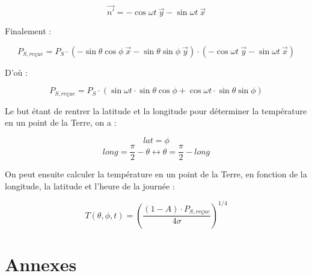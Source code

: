\documentclass[a4paper,11pt]{article}
\begin{document}
\[ \vec{n'} = - \cos \omega t ~ \vec{y} - \sin \omega t ~ \vec{x} \]

Finalement :

\[ P_{S,reçue} = P_S \cdot (- \sin \theta \cos \phi ~ \vec{x} - \sin \theta \sin \phi ~ \vec{y}) \cdot (- \cos \omega t ~ \vec{y} - \sin \omega t ~ \vec{x}) \]

D'où :

\[ P_{S,reçue} = P_S \cdot (\sin \omega t \cdot \sin \theta \cos \phi + \cos \omega t \cdot \sin \theta \sin \phi) \]

Le but étant de rentrer la latitude et la longitude pour déterminer la température en un point de la Terre, on a :

\[ lat = \phi \]
\[ long = \dfrac{\pi}{2} - \theta \leftrightarrow \theta = \dfrac{\pi}{2} - long \]

On peut ensuite calculer la température en un point de la Terre, en fonction de la longitude, la latitude et l'heure de la journée :

\[ T (\theta , \phi , t) = \left(\dfrac{(1 - A) \cdot P_{S,reçue}}{4\sigma}\right)^{1/4} \]


\newpage
\section{Annexes}
\end{document}
